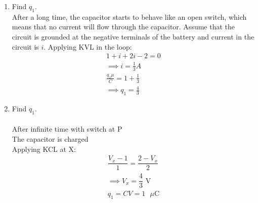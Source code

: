 \documentclass[journal,12pt,twocolumn]{IEEEtran}
\renewcommand\thesection{\arabic{section}}
\begin{document}
\begin{enumerate}[label=\arabic*.,ref=\thesection.\theenumi]

\item Find $q_1$.\\
\solution After a long time, the capacitor starts to behave like an open switch, which means that no current will flow through the capacitor. Assume that the circuit is grounded at the negative terminals of the battery and current in the circuit is $i$. Applying KVL in the loop:
	\begin{align}
		1+i+2i-2=0\\
		\implies i=\frac{1}{3}A\\
		\frac{q_1\mu}{C} = 1+\frac{1}{3}\\
		\implies q_1=\frac{4}{3}
	\end{align}

\item Find $q_1$.\\
\solution\\
After infinite time with switch at P\\
The capacitor is charged\\
Applying KCL at X:
\begin{align}
	\dfrac{V_x - 1}{1} = \dfrac{2 - V_x}{2}\\
	\implies V_x = \dfrac{4}{3} \text{ V}\\
	q_1 = CV = 1 \text{ $\mu$C}
\end{align}


\end{enumerate}
\end{document}
